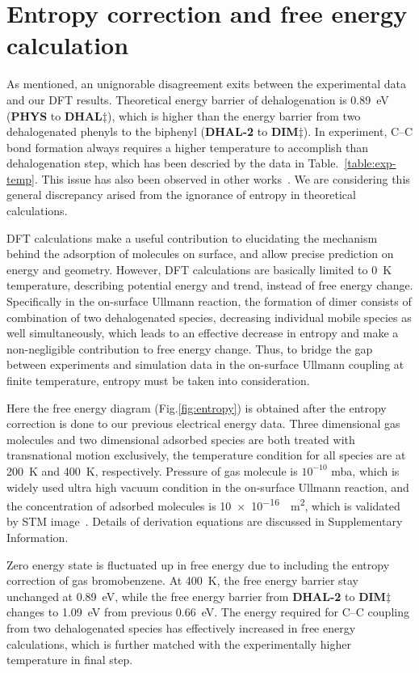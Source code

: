 \documentclass[journal=jacsat,manuscript=article]{achemso}
\newcommand{\zhzh}{\color{blue}}
\newcommand{\zhzh}{\color{blue}}
\newcommand{\sinfo}{Supplementary Information}
\begin{document}
\section{Entropy correction and free energy calculation}
{\zhzh
As mentioned, an unignorable disagreement exits between the experimental data and our DFT results. Theoretical energy barrier of dehalogenation is \SI{0.89}{\electronvolt} (\textbf{PHYS} to \textbf{DHAL$\ddagger$}), which is  higher than the energy barrier from two dehalogenated phenyls to the biphenyl (\textbf{DHAL-2} to \textbf{DIM$\ddagger$}). In experiment, C--C bond formation always requires a higher temperature to accomplish than dehalogenation step, which has been descried by the data in Table.~\ref{table:exp-temp}. This issue has also been observed in other works~\cite{jacs2013, pccp2010}. We are considering this general discrepancy arised from the ignorance of entropy in theoretical calculations. 

DFT calculations make a useful contribution to elucidating the mechanism behind the adsorption of molecules on surface, and allow precise prediction on energy and geometry. However, DFT calculations are basically limited to \SI{0}{\kelvin} temperature, describing potential energy and trend, instead of free energy change. Specifically in the on-surface Ullmann reaction, the formation of dimer consists of combination of two dehalogenated species, decreasing individual mobile species as well simultaneously,  which leads to an effective decrease in entropy and make a non-negligible contribution to free energy change. Thus, to bridge the gap between experiments and simulation data in the on-surface Ullmann coupling at finite temperature, entropy must be taken into consideration. 

Here the free energy diagram (Fig.\ref{fig:entropy}) is obtained after the entropy correction is done to our previous electrical energy data. Three dimensional gas molecules and two dimensional adsorbed species are both treated with transnational motion exclusively, the temperature condition for all species are at \SI{200}{\kelvin} and \SI{400}{\kelvin}, respectively. Pressure of gas molecule is $10^{-10}$ mba, which is widely used ultra high vacuum condition in the on-surface Ullmann reaction, and the concentration of adsorbed molecules is \SI{10e-16}{\per\metre\squared}, which is validated by STM image~\cite{ullmann_67}. Details of derivation equations are discussed in \sinfo.

Zero energy state is fluctuated up in free energy due to including the entropy correction of gas bromobenzene. At \SI{400}{\kelvin}, the free energy barrier stay unchanged at \SI{0.89}{\electronvolt}, while the free energy barrier from \textbf{DHAL-2} to \textbf{DIM$\ddagger$} changes to \SI{1.09}{\electronvolt} from previous \SI{0.66}{\electronvolt}. The energy required for C--C coupling from two dehalogenated species has effectively increased in free energy calculations, which is further matched with the experimentally higher temperature in final step.

}
\end{document}
